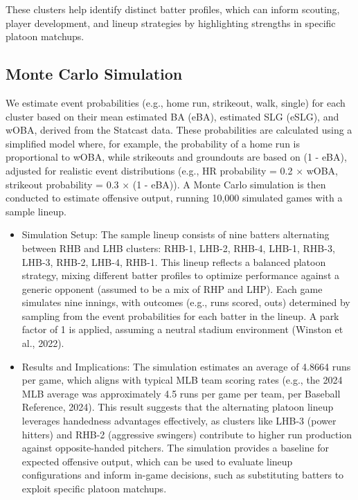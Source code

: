 \documentclass[
]{article}
\providecommand{\tightlist}{%
  \setlength{\itemsep}{0pt}\setlength{\parskip}{0pt}}
\begin{document}
These clusters help identify distinct batter profiles, which can inform
scouting, player development, and lineup strategies by highlighting
strengths in specific platoon matchups.

\hypertarget{monte-carlo-simulation}{%
\subsection{Monte Carlo Simulation}\label{monte-carlo-simulation}}

We estimate event probabilities (e.g., home run, strikeout, walk,
single) for each cluster based on their mean estimated BA (eBA),
estimated SLG (eSLG), and wOBA, derived from the Statcast data. These
probabilities are calculated using a simplified model where, for
example, the probability of a home run is proportional to wOBA, while
strikeouts and groundouts are based on (1 - eBA), adjusted for realistic
event distributions (e.g., HR probability = 0.2 × wOBA, strikeout
probability = 0.3 × (1 - eBA)). A Monte Carlo simulation is then
conducted to estimate offensive output, running 10,000 simulated games
with a sample lineup.

\begin{itemize}
\tightlist
\item
  Simulation Setup: The sample lineup consists of nine batters
  alternating between RHB and LHB clusters: RHB-1, LHB-2, RHB-4, LHB-1,
  RHB-3, LHB-3, RHB-2, LHB-4, RHB-1. This lineup reflects a balanced
  platoon strategy, mixing different batter profiles to optimize
  performance against a generic opponent (assumed to be a mix of RHP and
  LHP). Each game simulates nine innings, with outcomes (e.g., runs
  scored, outs) determined by sampling from the event probabilities for
  each batter in the lineup. A park factor of 1 is applied, assuming a
  neutral stadium environment (Winston et al., 2022).
\item
  Results and Implications: The simulation estimates an average of
  4.8664 runs per game, which aligns with typical MLB team scoring rates
  (e.g., the 2024 MLB average was approximately 4.5 runs per game per
  team, per Baseball Reference, 2024). This result suggests that the
  alternating platoon lineup leverages handedness advantages
  effectively, as clusters like LHB-3 (power hitters) and RHB-2
  (aggressive swingers) contribute to higher run production against
  opposite-handed pitchers. The simulation provides a baseline for
  expected offensive output, which can be used to evaluate lineup
  configurations and inform in-game decisions, such as substituting
  batters to exploit specific platoon matchups.
\end{itemize}
\end{document}
